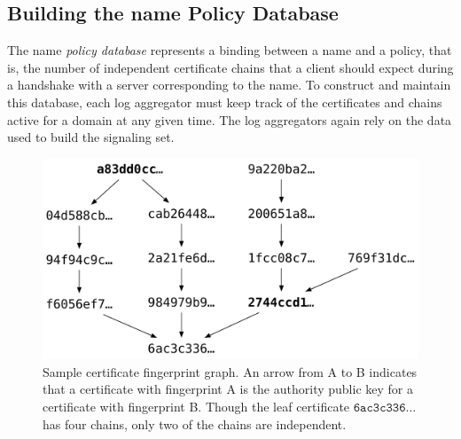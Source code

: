 \subsection{Building the \ac{name} Policy Database}
\label{sec:design:policy}

The \ac{name} \emph{policy database} represents a binding between a name and a policy, that
is, the number of independent certificate chains that a client
should expect during a handshake with a server corresponding to the name.
To construct and maintain this database, each log aggregator must keep track of
the certificates and chains active for a domain at any given time. The log
aggregators again rely on the data used to build the signaling set.

\begin{figure}
  \centering
  \includegraphics[width=\linewidth]{fig/chain}
  \caption{Sample certificate fingerprint graph. An arrow from A to B indicates
    that a certificate with fingerprint A is the authority public key for a
    certificate with fingerprint B. Though the leaf certificate
  $\texttt{6ac3c336}\ldots$ has four chains, only two of the chains are
independent.}
  \label{fig:chain}
\end{figure}

